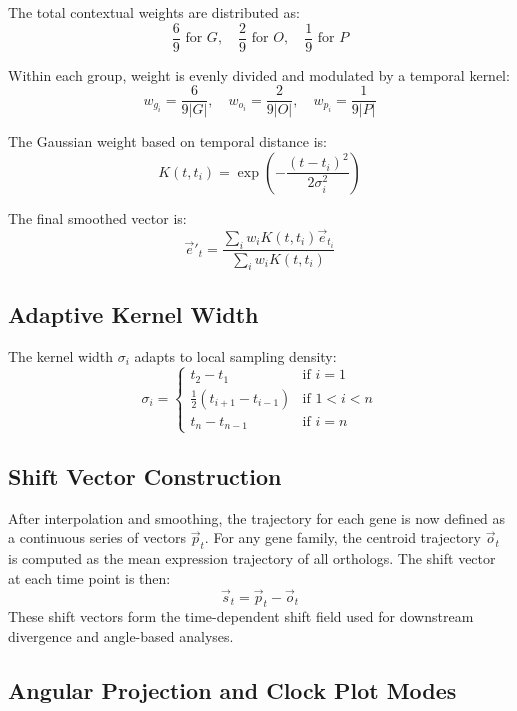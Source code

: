         The total contextual weights are distributed as:
        \[
            \frac{6}{9} \text{ for } G, \quad
            \frac{2}{9} \text{ for } O, \quad
            \frac{1}{9} \text{ for } P
        \]

        Within each group, weight is evenly divided and modulated by a temporal kernel:
        \[
            w_{g_i} = \frac{6}{9|G|}, \quad
            w_{o_i} = \frac{2}{9|O|}, \quad
            w_{p_i} = \frac{1}{9|P|}
        \]

        The Gaussian weight based on temporal distance is:
        \[
            K(t, t_i) = \exp\left( -\frac{(t - t_i)^2}{2\sigma_i^2} \right)
        \]

        The final smoothed vector is:
        \[
            \vec{e}'_t = \frac{\sum_i w_i K(t, t_i) \vec{e}_{t_i}}{\sum_i w_i K(t, t_i)}
        \]

    \subsection{Adaptive Kernel Width}

        The kernel width \( \sigma_i \) adapts to local sampling density:
        \[
            \sigma_i =
                \begin{cases}
                    t_2 - t_1 & \text{if } i = 1 \\
                    \frac{1}{2}(t_{i+1} - t_{i-1}) & \text{if } 1 < i < n \\
                    t_n - t_{n-1} & \text{if } i = n
                \end{cases}
        \]

    \subsection{Shift Vector Construction}

        After interpolation and smoothing, the trajectory for each gene is now defined as a continuous series of vectors \( \vec{p}_t \). For any gene family, the centroid trajectory \( \vec{o}_t \) is computed as the mean expression trajectory of all orthologs. The shift vector at each time point is then:
        \[
            \vec{s}_t = \vec{p}_t - \vec{o}_t
        \]
        These shift vectors form the time-dependent shift field used for downstream divergence and angle-based analyses.

    \subsection{Angular Projection and Clock Plot Modes}


